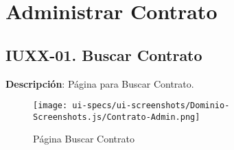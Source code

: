 
\section{Administrar Contrato} \label{sec:cf-ui-admin-contrato}

\subsection{IUXX-01. Buscar Contrato} \label{sec:ui-page-search-contrato}

\textbf{Descripci\'on}: P\'agina para Buscar Contrato.\\

\begin{figure}[H]
	\label{tab:ui-search-contrato-page}
	\texttt{[image: ui-specs/ui-screenshots/Dominio-Screenshots.js/Contrato-Admin.png]}
	\caption{P\'agina Buscar Contrato}
\end{figure}

